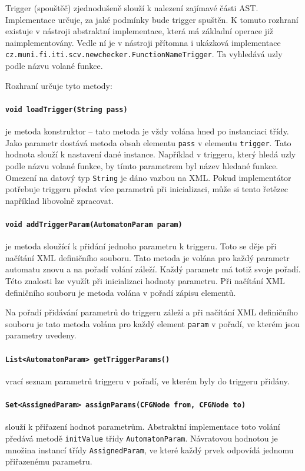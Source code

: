 \documentclass[11pt,final,oneside]{fithesis}
\begin{document}
Trigger (spouštěč) zjednodušeně slouží k nalezení zajímavé části AST. Implementace určuje, za jaké podmínky bude trigger spuštěn. K tomuto rozhraní existuje v nástroji abstraktní implementace, která má základní operace již naimplementovány. Vedle ní je v nástroji přítomna i ukázková implementace \texttt{cz.muni.fi.iti.scv.newchecker.FunctionNameTrigger}. Ta vyhledává uzly podle názvu volané funkce.

Rozhraní určuje tyto metody:

\paragraph{\texttt{void loadTrigger(String pass)}} je metoda  konstruktor -- tato metoda je vždy volána hned po instanciaci třídy. Jako parametr dostává metoda obsah elementu {\tt pass} v elementu {\tt trigger}. Tato hodnota slouží k nastavení dané instance. Například v triggeru, který hledá uzly podle názvu volané funkce, by tímto parametrem byl název hledané funkce. Omezení na datový typ {\tt String} je dáno vazbou na XML. Pokud implementátor potřebuje triggeru předat více parametrů při inicializaci, může si tento řetězec například libovolně zpracovat.

\paragraph{\texttt{void addTriggerParam(AutomatonParam param)}} je metoda sloužící k přidání jednoho parametru k triggeru. Toto se děje při načítání XML definičního souboru. Tato metoda je volána pro každý parametr automatu znovu a na pořadí volání záleží. Každý parametr má totiž svoje pořadí. Této znalosti lze využít při inicializaci hodnoty parametru. Při načítání XML definičního souboru je metoda volána v pořadí zápisu elementů. 

Na pořadí přidávání parametrů do triggeru záleží a při načítání XML definičního souboru je tato metoda volána pro každý element {\tt param} v pořadí, ve kterém jsou parametry uvedeny. 

\paragraph{\texttt{List<AutomatonParam> getTriggerParams()}} vrací seznam parametrů triggeru v pořadí, ve kterém byly do triggeru přidány.

\paragraph{\texttt{Set<AssignedParam> assignParams(CFGNode from, CFGNode to)}} slouží k přiřazení hodnot parametrům. Abstraktní implementace toto volání předává metodě \texttt{initValue} třídy \texttt{AutomatonParam}. Návratovou hodnotou je množina instancí třídy \texttt{AssignedParam}, ve které každý prvek odpovídá jednomu přiřazenému parametru.
\end{document}
